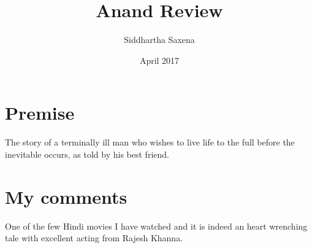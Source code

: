 \documentclass{article}
\title{Anand Review}
\author{Siddhartha Saxena}
\date{April 2017}
\begin{document}
\maketitle

\section{Premise}
The story of a terminally ill man who wishes to live life to the full before the inevitable occurs, as told by his best friend.
\section{My comments}
One of the few Hindi movies I have watched and it is indeed an heart wrenching tale with excellent acting from Rajesh Khanna.
\end{document}
